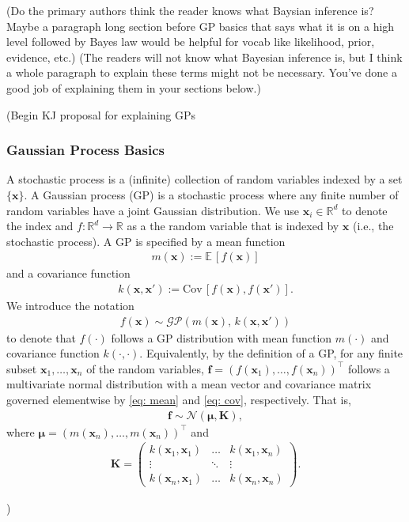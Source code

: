 \documentclass[journal=jacsat,manuscript=article]{achemso}
\newcommand{\kjnote}[1]{{\color{blue} (#1)}}
\newcommand{\mcnote}[1]{{\color{purple} (#1)}}
\newcommand{\alltodo}[1]{{\color{cyan} (#1)}}
\newcommand{\reals}{\ensuremath{\mathbb{R}}}
\newcommand{\xvec}{\ensuremath{\mathbf{x}}}
\begin{document}
\alltodo{Do the primary authors think the reader knows what Baysian inference is? Maybe a paragraph long section before GP basics that says what it is on a high level followed by Bayes law would be helpful for vocab like likelihood, prior, evidence, etc.}
\mcnote{The readers will not know what Bayesian inference is, but I think a whole paragraph to explain these terms might not be necessary. You've done a good job of explaining them in your sections below.}
\\
\kjnote{Begin KJ proposal for explaining GPs
\subsubsection{Gaussian Process Basics}
A stochastic process is a (infinite) collection of random variables indexed by a set $\{\xvec\}$. A Gaussian process (GP) is a stochastic process where any finite number of random variables have a joint Gaussian distribution. We use $\xvec_i \in \reals^d$ to denote the index and $f: \reals^d \rightarrow \reals$ as a the random variable that is indexed by $\xvec$ (i.e., the stochastic process). A GP is specified by a mean function
\begin{gather}
    m(\xvec) := \mathbb{E}\,[f(\xvec)] \label{eq: mean}
\end{gather}
and a covariance function
\begin{gather}
    k(\xvec, \xvec') := \text{Cov}\,[f(\xvec), f(\mathbf{x'})]. \label{eq: cov}
\end{gather}
We introduce the notation 
\begin{gather*}
    f(\xvec)\sim \mathcal{GP}(m(\xvec), \, k(\xvec,\xvec'))
\end{gather*}
to denote that $f(\cdot)$ follows a GP distribution with mean function $m(\cdot)$ and covariance function $k(\cdot,\cdot)$. Equivalently, by the definition of a GP, for any finite subset $\xvec_1, \dots, \xvec_n$ of the random variables, $\mathbf{f}=(f(\xvec_1),  \dots, f(\xvec_n))^\intercal$ follows a multivariate normal distribution with a mean vector and covariance matrix governed elementwise by \eqref{eq: mean} and \eqref{eq: cov}, respectively. That is,
\begin{gather*}
     \mathbf{f} \sim \mathcal{N}(\boldsymbol{\mu}, \mathbf{K}),
\end{gather*}
where $\boldsymbol{\mu} = (m(\xvec_n), \dots, m(\xvec_n))^\intercal$ and 
\begin{gather}
    \mathbf{K} = 
    \left(
    \begin{matrix}
        k(\xvec_1,\xvec_1) & \dots & k(\xvec_1,\xvec_n) \\
        \vdots & \ddots & \vdots \\
        k(\xvec_n,\xvec_1) & \dots & k(\xvec_n,\xvec_n)
    \end{matrix}\right).
\end{gather}


}
\end{document}
